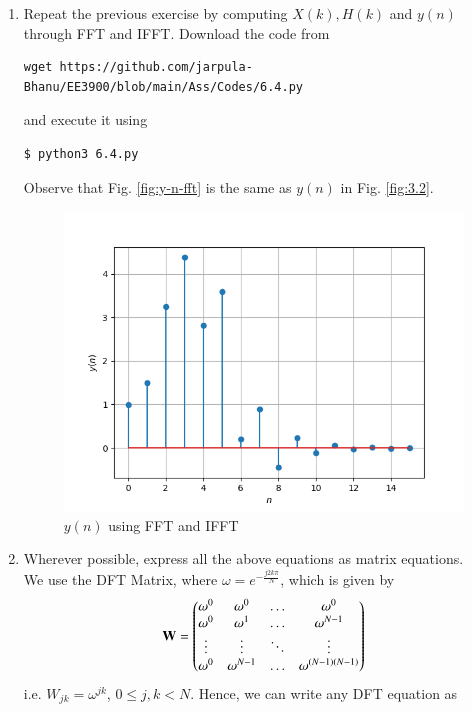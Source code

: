 \documentclass[journal,12pt,twocolumn]{IEEEtran}
\renewcommand\thesection{\arabic{section}}
\begin{document}
\begin{enumerate}[label=\thesection.\arabic*
,ref=\thesection.\theenumi]
\item Repeat the previous exercise by computing $X(k), H(k)$ and $y(n)$ through FFT and 
 IFFT.
 \solution Download the code from
\begin{lstlisting}
wget https://github.com/jarpula-Bhanu/EE3900/blob/main/Ass/Codes/6.4.py
\end{lstlisting}
and execute it using
\begin{lstlisting}
$ python3 6.4.py
\end{lstlisting}
Observe that Fig. \eqref{fig:y-n-fft} is the same as $y(n)$ in Fig. \eqref{fig:3.2}.
\begin{figure}
\centering
\includegraphics[width=\columnwidth]{figs/6.4.png}
\caption{$y(n)$ using FFT and IFFT}
\label{fig:y-n-fft}
\end{figure}
\item Wherever possible, express all the above equations as matrix equations.\\
\solution
We use the DFT Matrix, where $\omega = e^{-\frac{j2k\pi}{N}}$, which is given by
\begin{align}
	\mathbf{W} = 
	\begin{pmatrix}
		\omega^0 & \omega^0 & \ldots & \omega^0 \\
		\omega^0 & \omega^1 & \ldots & \omega^{N - 1} \\
		\vdots & \vdots & \ddots & \vdots \\
		\omega^0 & \omega^{N - 1} & \ldots & \omega^{(N -1)(N - 1)}
	\end{pmatrix}
\end{align}
i.e. $W_{jk} = \omega^{jk}$, $0 \leq j, k < N$. Hence, we can write any DFT equation as

\end{enumerate}
\end{document}
